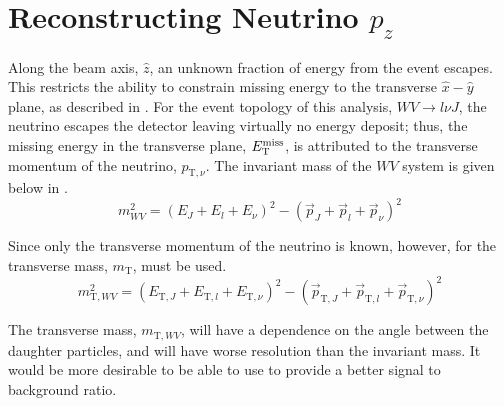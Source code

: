 \chapter{Reconstructing Neutrino $p_z$}
\label{ch:neutrinopz}

Along the beam axis, $\hat{z}$, an unknown fraction of energy from the event escapes. This restricts the ability to constrain missing energy to the transverse $\hat{x}-\hat{y}$ plane, as described in \Ch{\ref{ch:objreco}}. 
For the event topology of this analysis, $WV\to l\nu J$, the neutrino escapes the detector leaving virtually no energy deposit; thus, the missing energy in the transverse plane, $E_{\mathrm T}^{\rm miss}$, is attributed to the transverse momentum of the neutrino, $p_{\mathrm{T}, \nu}$. The invariant mass of the $WV$ system is given below in \Eqn{\ref{eq:wv_m}}.
\begin{equation}
m_{WV}^2 = \left(E_{J} + E_{l} + E_{\nu}\right)^2 - \left(\vec{p}_{J} + \vec{p}_{l} + \vec{p}_{\nu}\right)^2
\label{eq:wv_m}
\end{equation}

Since only the transverse momentum of the neutrino is known, however, \Eqn{\ref{eq:wv_mt}} for the transverse mass, $m_{\mathrm{T}}$, must be used.
\begin{equation}
m_{\mathrm{T}, WV}^2 = \left(E_{\mathrm{T}, J} + E_{\mathrm{T}, l} + E_{\mathrm{T}, \nu}\right)^2 - \left(\vec{p}_{\mathrm{T}, J} + \vec{p}_{\mathrm{T}, l} + \vec{p}_{\mathrm{T}, \nu}\right)^2
\label{eq:wv_mt}
\end{equation}

The transverse mass, $m_{\mathrm{T}, WV}$, will have a dependence on the angle between the daughter particles, and will have worse resolution than the invariant mass. It would be more desirable to be able to use \Eqn{\ref{eq:wv_m}} to provide a better signal to background ratio.


